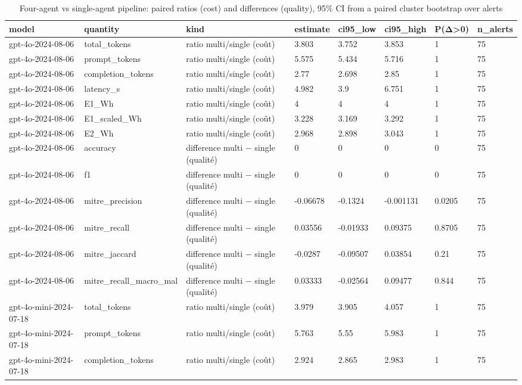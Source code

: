 \begin{table}[!t]
\centering
\caption{Four-agent vs single-agent pipeline: paired ratios (cost) and differences (quality), 95\% CI from a paired cluster bootstrap over alerts}
\label{tab:paired}
\begin{tabular}{llllllll}
\hline
model & quantity & kind & estimate & ci95\_low & ci95\_high & P(Δ>0) & n\_alerts \\
\hline
gpt-4o-2024-08-06 & total\_tokens & ratio multi/single (coût) & 3.803 & 3.752 & 3.853 & 1 & 75 \\
gpt-4o-2024-08-06 & prompt\_tokens & ratio multi/single (coût) & 5.575 & 5.434 & 5.716 & 1 & 75 \\
gpt-4o-2024-08-06 & completion\_tokens & ratio multi/single (coût) & 2.77 & 2.698 & 2.85 & 1 & 75 \\
gpt-4o-2024-08-06 & latency\_s & ratio multi/single (coût) & 4.982 & 3.9 & 6.751 & 1 & 75 \\
gpt-4o-2024-08-06 & E1\_Wh & ratio multi/single (coût) & 4 & 4 & 4 & 1 & 75 \\
gpt-4o-2024-08-06 & E1\_scaled\_Wh & ratio multi/single (coût) & 3.228 & 3.169 & 3.292 & 1 & 75 \\
gpt-4o-2024-08-06 & E2\_Wh & ratio multi/single (coût) & 2.968 & 2.898 & 3.043 & 1 & 75 \\
gpt-4o-2024-08-06 & accuracy & difference multi − single (qualité) & 0 & 0 & 0 & 0 & 75 \\
gpt-4o-2024-08-06 & f1 & difference multi − single (qualité) & 0 & 0 & 0 & 0 & 75 \\
gpt-4o-2024-08-06 & mitre\_precision & difference multi − single (qualité) & -0.06678 & -0.1324 & -0.001131 & 0.0205 & 75 \\
gpt-4o-2024-08-06 & mitre\_recall & difference multi − single (qualité) & 0.03556 & -0.01933 & 0.09375 & 0.8705 & 75 \\
gpt-4o-2024-08-06 & mitre\_jaccard & difference multi − single (qualité) & -0.0287 & -0.09507 & 0.03854 & 0.21 & 75 \\
gpt-4o-2024-08-06 & mitre\_recall\_macro\_mal & difference multi − single (qualité) & 0.03333 & -0.02564 & 0.09477 & 0.844 & 75 \\
gpt-4o-mini-2024-07-18 & total\_tokens & ratio multi/single (coût) & 3.979 & 3.905 & 4.057 & 1 & 75 \\
gpt-4o-mini-2024-07-18 & prompt\_tokens & ratio multi/single (coût) & 5.763 & 5.55 & 5.983 & 1 & 75 \\
gpt-4o-mini-2024-07-18 & completion\_tokens & ratio multi/single (coût) & 2.924 & 2.865 & 2.983 & 1 & 75 \\

\end{tabular}
\end{table}
